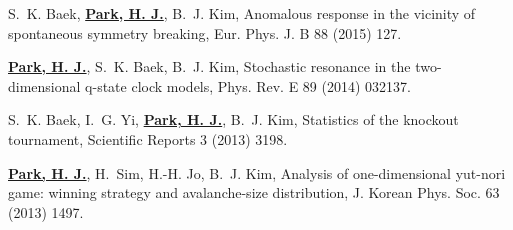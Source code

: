 \documentclass[11pt,a4paper,sans]{moderncv}        %
\begin{document}
\begin{etaremune}
\item
S.~K. Baek, \underline{\textbf{Park, H. J.}}, B.~J. Kim, Anomalous response in
  the vicinity of spontaneous symmetry breaking, Eur. Phys. J. B 88 (2015) 127.

\item
\underline{\textbf{Park, H. J.}}, S.~K. Baek, B.~J. Kim, Stochastic resonance
  in the two-dimensional q-state clock models, Phys. Rev. E 89 (2014) 032137.

\item
S.~K. Baek, I.~G. Yi, \underline{\textbf{Park, H. J.}}, B.~J. Kim, Statistics
  of the knockout tournament, Scientific Reports 3 (2013) 3198.

\item
\underline{\textbf{Park, H. J.}}, H.~Sim, H.-H. Jo, B.~J. Kim, Analysis of
  one-dimensional yut-nori game: winning strategy and avalanche-size
  distribution, J. Korean Phys. Soc. 63 (2013) 1497.

\end{etaremune}



\begin{comment}

\textbf{Network}
\begin{itemize}%
\item Network partitioning using Potts model
\item Measurements of network properties based on C++ programming and python
\item Network construction from time-series data
\end{itemize}

\textbf{Spin system}
\begin{itemize}%
\item Stochastic response in q-state clock model under oscillating external field
\end{itemize}

\section{Skills}
\cvitem{Programming language}{C, C++, python}
\cvitem{Methodology}{Monte Carlo simulation, numerical calculation, social network analysis}
\cvitem{Software tools}{Mathematica, Gephi, Pajek}
\end{comment}
\end{document}
